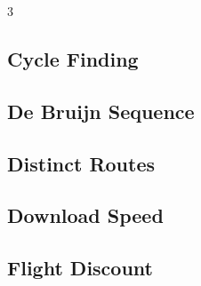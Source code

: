 \documentclass[8pt]{extarticle}
\begin{document}
\begin{multicols*}{3}
\subsection{Cycle Finding}
\begin{caixaenunciado}

\end{caixaenunciado}
\vspace{0.3cm}


\subsection{De Bruijn Sequence}
\begin{caixaenunciado}

\end{caixaenunciado}
\vspace{0.3cm}


\subsection{Distinct Routes}
\begin{caixaenunciado}

\end{caixaenunciado}
\vspace{0.3cm}


\subsection{Download Speed}
\begin{caixaenunciado}

\end{caixaenunciado}
\vspace{0.3cm}


\subsection{Flight Discount}
\begin{caixaenunciado}

\end{caixaenunciado}
\vspace{0.3cm}



\end{multicols*}
\end{document}
